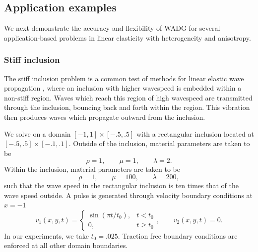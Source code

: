 \documentclass{siamart0216}
\begin{document}
%


\subsection{Application examples}

We next demonstrate the accuracy and flexibility of WADG for several application-based problems in linear elasticity with heterogeneity and anisotropy.  

\subsubsection{Stiff inclusion}

The stiff inclusion problem  is a common test of methods for linear elastic wave propagation \cite{leveque2002finite,kaser2006arbitrary,appelo2015energy}, where an inclusion with higher wavespeed is embedded within a non-stiff region.  Waves which reach this region of high wavespeed are transmitted through the inclusion, bouncing back and forth within the region.  This vibration then produces waves which propagate outward from the inclusion.  

We solve on a domain $[-1,1]\times [-.5, .5]$ with a rectangular inclusion located at $[-.5,.5]\times[-.1,.1]$.  Outside of the inclusion, material parameters are taken to be 
\[
\rho = 1, \qquad \mu = 1,\qquad \lambda = 2.
\]
Within the inclusion, material parameters are taken to be
\[
\rho = 1, \qquad \mu = 100,\qquad \lambda = 200,
\]
such that the wave speed in the rectangular inclusion is ten times that of the wave speed outside.  A pulse is generated through velocity boundary conditions at $x = -1$
\[
v_1(x,y,t) = \begin{cases}
\sin(\pi t / t_0), & t < t_0\\
0, & t \geq t_0
\end{cases}, \qquad
v_2(x,y,t) = 0.
\]
In our experiments, we take $t_0 = .025$.  Traction free boundary conditions are enforced at all other domain boundaries.  
\end{document}
